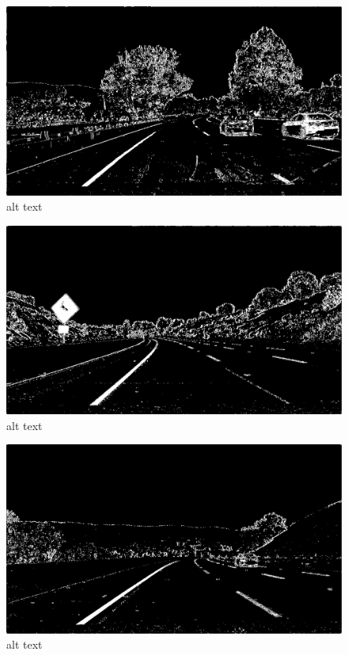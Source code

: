 \documentclass[11pt]{article}
\makeatletter
\def\maxwidth{\ifdim\Gin@nat@width>\linewidth\linewidth
    \else\Gin@nat@width\fi}
\let\Oldincludegraphics\includegraphics
\renewcommand{\includegraphics}[1]{\Oldincludegraphics[width=.8\maxwidth]{#1}}
\makeatother
\begin{document}
\begin{figure}
\centering
\includegraphics{./output_images/test1_binary_thresholded.jpg}
\caption{alt text}
\end{figure}

\begin{figure}
\centering
\includegraphics{./output_images/test2_binary_thresholded.jpg}
\caption{alt text}
\end{figure}

\begin{figure}
\centering
\includegraphics{./output_images/test3_binary_thresholded.jpg}
\caption{alt text}
\end{figure}
\end{document}
